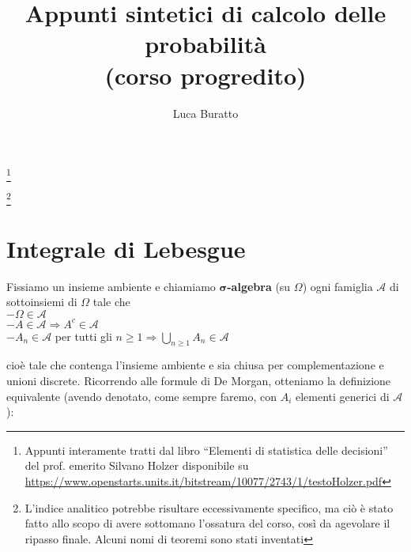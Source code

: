 \documentclass[a4paper,11pt]{article}
\theoremstyle{plain}
\theoremstyle{definition}
\theoremstyle{remark}
\begin{document}
\title{Appunti sintetici di calcolo delle probabilità \\(corso progredito)}
 \author{Luca Buratto}
\maketitle
\footnote{Appunti interamente tratti dal libro “Elementi di statistica delle decisioni” del prof. emerito Silvano Holzer disponibile su \url{https://www.openstarts.units.it/bitstream/10077/2743/1/testoHolzer.pdf}{} }

\footnote{L'indice analitico potrebbe risultare eccessivamente specifico, ma ciò è stato fatto allo scopo di avere sottomano l'ossatura  del corso, così da agevolare il ripasso finale. Alcuni nomi di teoremi sono stati inventati}


\newpage

\tableofcontents
\newpage
\section{Integrale di Lebesgue}
Fissiamo un insieme ambiente e chiamiamo $\boldsymbol{\sigma}$\textbf{-algebra} (su $\Omega$) ogni famiglia $\mathcal{A}$ di sottoinsiemi di $\Omega$ tale che\\
$-\Omega\in \mathcal{A}$\\
$-A\in \mathcal{A}\Rightarrow A^{c}\in \mathcal{A}$\\
$-A_{n}\in \mathcal{A}$ per tutti gli $n\displaystyle \geq 1\Rightarrow\bigcup_{n\geq 1}A_{n}\in \mathcal{A}$

cio\`{e} tale che contenga l'insieme ambiente e sia chiusa per complementazione e unioni discrete. Ricorrendo alle formule di De Morgan, otteniamo la definizione equivalente (avendo denotato, come sempre faremo, con $A_{i}$ elementi generici di $\mathcal{A}$):
\end{document}
